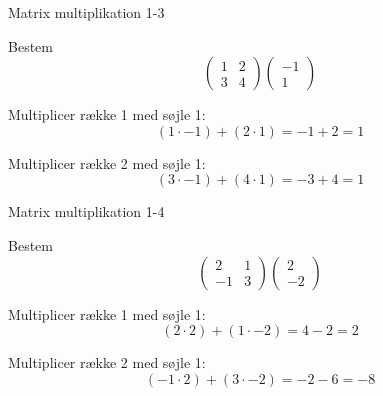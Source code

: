 \documentclass{article}
\begin{document}
\newpage

\begin{exercise}{Matrix multiplikation 1-3}

Bestem
\[
\begin{pmatrix} 1 & 2 \\ 3 & 4 \end{pmatrix} \begin{pmatrix} -1 \\ 1 \end{pmatrix}
\]


\hint

Multiplicer række 1 med søjle 1:
\[
(1 \cdot -1) + (2 \cdot 1) = -1 + 2 = 1
\]

\hint

Multiplicer række 2 med søjle 1:
\[
(3 \cdot -1) + (4 \cdot 1) = -3 + 4 = 1
\]

\end{exercise}

\newpage

\begin{exercise}{Matrix multiplikation 1-4}

Bestem
\[
\begin{pmatrix} 2 & 1 \\ -1 & 3 \end{pmatrix} \begin{pmatrix} 2 \\ -2 \end{pmatrix}
\]


\hint

Multiplicer række 1 med søjle 1:
\[
(2 \cdot 2) + (1 \cdot -2) = 4 - 2 = 2
\]

\hint

Multiplicer række 2 med søjle 1:
\[
(-1 \cdot 2) + (3 \cdot -2) = -2 - 6 = -8
\]

\end{exercise}

\newpage
\end{document}

